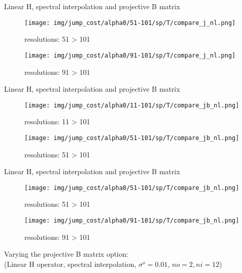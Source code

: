 \documentclass[francais]{beamer}
\begin{document}
\begin{frame}{Linear H, spectral interpolation and projective B matrix}
\begin{center}
\begin{figure}
  \texttt{[image: img/jump\_cost/alpha0/51-101/sp/T/compare\_j\_nl.png]}
  \caption{resolutions: 51 > 101}
\endminipage\hfill
{}
  \texttt{[image: img/jump\_cost/alpha0/91-101/sp/T/compare\_j\_nl.png]}
  \caption{resolutions: 91 > 101}
\endminipage
\end{figure}
\end{center}
\end{frame}

\begin{frame}{Linear H, spectral interpolation and projective B matrix}
\begin{center}
\begin{figure}
  \texttt{[image: img/jump\_cost/alpha0/11-101/sp/T/compare\_jb\_nl.png]}
  \caption{resolutions: 11 > 101}
\endminipage\hfill
{}
  \texttt{[image: img/jump\_cost/alpha0/51-101/sp/T/compare\_jb\_nl.png]}
  \caption{resolutions: 51 > 101}
\endminipage
\end{figure}
\end{center}
\end{frame}


\begin{frame}{Linear H, spectral interpolation and projective B matrix}
\begin{center}
\begin{figure}
  \texttt{[image: img/jump\_cost/alpha0/51-101/sp/T/compare\_jb\_nl.png]}
  \caption{resolutions: 51 > 101}
\endminipage\hfill
{}
  \texttt{[image: img/jump\_cost/alpha0/91-101/sp/T/compare\_jb\_nl.png]}
  \caption{resolutions: 91 > 101}
\endminipage
\end{figure}
\end{center}
\end{frame}


\begin{frame}
\begin{center}
\huge{Varying the projective B matrix option:}\\
\vspace{+0.5cm}
 \Large{(Linear H operator, spectral interpolation, $\sigma^o=0.01$, $no=2, ni=12$)}
\end{center}
\end{frame}
\end{document}
